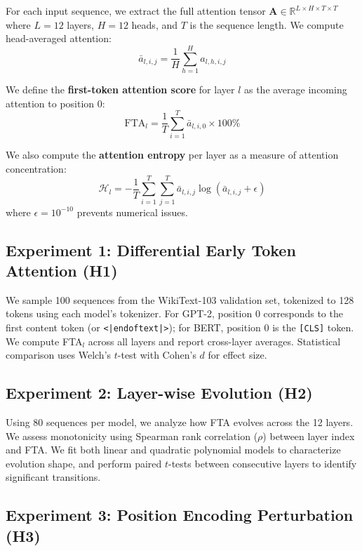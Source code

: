 \documentclass{article}
\begin{document}
For each input sequence, we extract the full attention tensor $\mathbf{A} \in \mathbb{R}^{L \times H \times T \times T}$ where $L=12$ layers, $H=12$ heads, and $T$ is the sequence length. We compute head-averaged attention:
\begin{equation}
    \bar{a}_{l,i,j} = \frac{1}{H}\sum_{h=1}^{H} a_{l,h,i,j}
\end{equation}

We define the \textbf{first-token attention score} for layer $l$ as the average incoming attention to position 0:
\begin{equation}
    \text{FTA}_l = \frac{1}{T}\sum_{i=1}^{T} \bar{a}_{l,i,0} \times 100\%
\end{equation}

We also compute the \textbf{attention entropy} per layer as a measure of attention concentration:
\begin{equation}
    \mathcal{H}_l = -\frac{1}{T}\sum_{i=1}^{T}\sum_{j=1}^{T} \bar{a}_{l,i,j} \log(\bar{a}_{l,i,j} + \epsilon)
\end{equation}
where $\epsilon = 10^{-10}$ prevents numerical issues.

\subsection{Experiment 1: Differential Early Token Attention (H1)}

We sample 100 sequences from the WikiText-103 validation set, tokenized to 128 tokens using each model's tokenizer. For GPT-2, position 0 corresponds to the first content token (or \texttt{<|endoftext|>}); for BERT, position 0 is the \texttt{[CLS]} token. We compute FTA$_l$ across all layers and report cross-layer averages. Statistical comparison uses Welch's $t$-test with Cohen's $d$ for effect size.

\subsection{Experiment 2: Layer-wise Evolution (H2)}

Using 80 sequences per model, we analyze how FTA evolves across the 12 layers. We assess monotonicity using Spearman rank correlation ($\rho$) between layer index and FTA. We fit both linear and quadratic polynomial models to characterize evolution shape, and perform paired $t$-tests between consecutive layers to identify significant transitions.

\subsection{Experiment 3: Position Encoding Perturbation (H3)}
\end{document}
